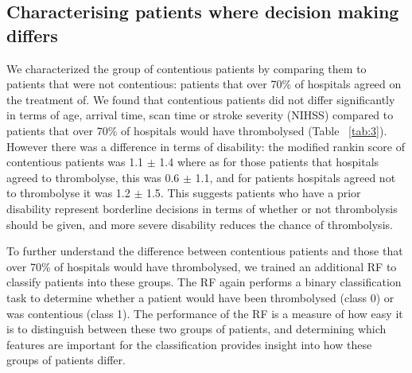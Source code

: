 \documentclass[12pt,a4paper, pdftex]{elsarticle}
\begin{document}

\subsection{Characterising patients where decision making differs}

We characterized the group of contentious patients by comparing them to patients that were not contentious: patients that over 70\% of hospitals agreed on the treatment of. We found that contentious patients did not differ significantly in terms of age, arrival time, scan time or stroke severity (NIHSS) compared to patients that over 70\% of hospitals would have thrombolysed (Table ~\ref{tab:3}). However there was a difference in terms of disability: the modified rankin score of contentious patients was 1.1 $\pm$ 1.4 where as for those patients that hospitals agreed to thrombolyse, this was 0.6 $\pm$ 1.1, and for patients hospitals agreed not to thrombolyse it was 1.2 $\pm$ 1.5. This suggests patients who have a prior disability represent borderline decisions in terms of whether or not thrombolysis should be given, and more severe disability reduces the chance of thrombolysis. 


To further understand the difference between contentious patients and those that over 70\% of hospitals would have thrombolysed, we trained an additional RF to classify patients into these groups. The RF again performs a binary classification task to determine whether a patient would have been thrombolysed (class 0) or was contentious (class 1). The performance of the RF is a measure of how easy it is to distinguish between these two groups of patients, and determining which features are important for the classification provides insight into how these groups of patients differ. 
\end{document}

